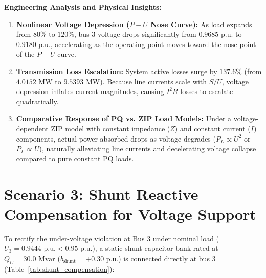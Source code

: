 \documentclass[12pt,a4paper,oneside]{report}
\begin{document}
\noindent \textbf{Engineering Analysis and Physical Insights:}
\begin{enumerate}
    \item \textbf{Nonlinear Voltage Depression ($P-U$ Nose Curve):} As load expands from $80\%$ to $120\%$, bus 3 voltage drops significantly from $0.9685\text{ p.u.}$ to $0.9180\text{ p.u.}$, accelerating as the operating point moves toward the nose point of the $P-U$ curve.
    \item \textbf{Transmission Loss Escalation:} System active losses surge by $137.6\%$ (from $4.0152\text{ MW}$ to $9.5393\text{ MW}$). Because line currents scale with $S/U$, voltage depression inflates current magnitudes, causing $I^2 R$ losses to escalate quadratically.
    \item \textbf{Comparative Response of PQ vs. ZIP Load Models:} Under a voltage-dependent ZIP model with constant impedance ($Z$) and constant current ($I$) components, actual power absorbed drops as voltage degrades ($P_L \propto U^2$ or $P_L \propto U$), naturally alleviating line currents and decelerating voltage collapse compared to pure constant PQ loads.
\end{enumerate}

\section{Scenario 3: Shunt Reactive Compensation for Voltage Support}
To rectify the under-voltage violation at Bus 3 under nominal load ($U_3 = 0.9444\text{ p.u.} < 0.95\text{ p.u.}$), a static shunt capacitor bank rated at $Q_C = 30.0\text{ Mvar}$ ($b_{\text{shunt}} = +0.30\text{ p.u.}$) is connected directly at bus 3 (Table~\ref{tab:shunt_compensation}):

\begin{table}[H]
\centering
\caption{Technical impact of shunt capacitor compensation at bus 3 ($Q_C = 30\text{ Mvar}$).}
\label{tab:shunt_compensation}
\end{table}
\end{document}
